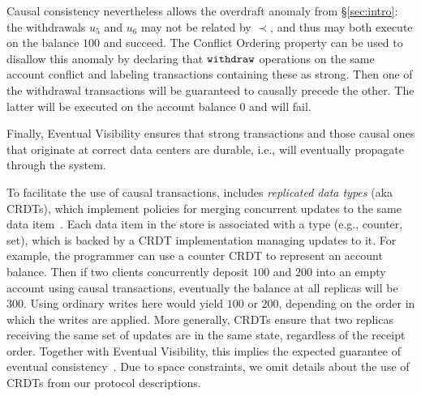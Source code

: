 Causal consistency nevertheless allows the overdraft anomaly from
\S\ref{sec:intro}: the withdrawals $u_5$ and $u_6$ may not be related by
$\prec$, and thus may both execute on the balance $100$ and succeed. The
Conflict Ordering property can be used to disallow this anomaly by declaring
that ${\tt withdraw}$ operations on the same account conflict and labeling
transactions containing these as strong.
Then one of the withdrawal transactions will be guaranteed to causally precede
the other. The latter will be executed on the account balance $0$ and will fail.

Finally, Eventual Visibility ensures that strong transactions and those causal
ones that originate at correct data centers are durable, i.e., will eventually
propagate through the system.





To facilitate the use of causal transactions, \System includes {\em replicated
  data types} (aka CRDTs), which implement policies for merging concurrent
updates to the same data item~\cite{crdts}.
Each data item in the store is associated with a type (e.g., counter, set),
which is backed by a CRDT implementation managing updates to it. For example,
the programmer can use a counter CRDT to represent an account balance. Then if
two clients concurrently deposit $100$ and $200$ into an empty account using
causal transactions, eventually the balance at all replicas will be $300$. Using
ordinary writes here would yield $100$ or $200$, depending on the order in which
the writes are applied. More generally, CRDTs ensure
that two replicas receiving the same set of updates are in the same state,
regardless of the receipt order. Together with Eventual Visibility, this implies
the expected guarantee of eventual consistency~\cite{bayou}. Due to space
constraints, we omit details about the use of CRDTs from our protocol
descriptions.















